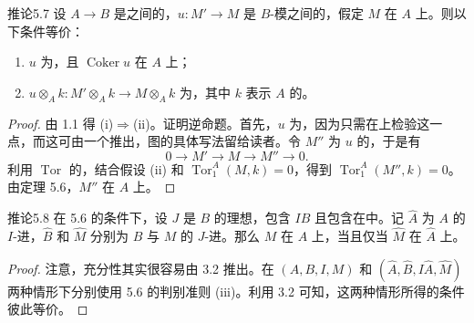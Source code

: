 \begin{SGAresult}{推论}{5.7}
设 $A\to B$ 是之间的，$u:M'\to M$ 是 $B$-模之间的，假定 $M$ 在 $A$ 上。则以下条件等价：
\begin{enumerate}
\item[(i)] $u$ 为，且 $\operatorname{Coker}u$ 在 $A$ 上；
\item[(ii)] $u\otimes_A k:M'\otimes_A k\to M\otimes_A k$ 为，其中 $k$ 表示 $A$ 的。
\end{enumerate}
\end{SGAresult}
\begin{proof}
由 1.1 得 (i)$\Rightarrow$(ii)。证明逆命题。首先，$u$ 为，因为只需在上检验这一点，而这可由一个推出，图的具体写法留给读者。令 $M''$ 为 $u$ 的，于是有
\[
0\longrightarrow M'\longrightarrow M\longrightarrow M''\longrightarrow0.
\]
利用 $\operatorname{Tor}$ 的，结合假设 (ii) 和 $\operatorname{Tor}_1^A(M,k)=0$，得到 $\operatorname{Tor}_1^A(M'',k)=0$。由定理 5.6，$M''$ 在 $A$ 上。
\end{proof}

\begin{SGAresult}{推论}{5.8}
在 5.6 的条件下，设 $J$ 是 $B$ 的理想，包含 $IB$ 且包含在中。记 $\widehat A$ 为 $A$ 的 $I$-进，$\widehat B$ 和 $\widehat M$ 分别为 $B$ 与 $M$ 的 $J$-进。那么 $M$ 在 $A$ 上，当且仅当 $\widehat M$ 在 $\widehat A$ 上。
\end{SGAresult}
\begin{proof}
注意，充分性其实很容易由 3.2 推出。在 $(A,B,I,M)$ 和 $(\widehat A,\widehat B,I\widehat A,\widehat M)$ 两种情形下分别使用 5.6 的判别准则 (iii)。利用 3.2 可知，这两种情形所得的条件彼此等价。
\end{proof}

